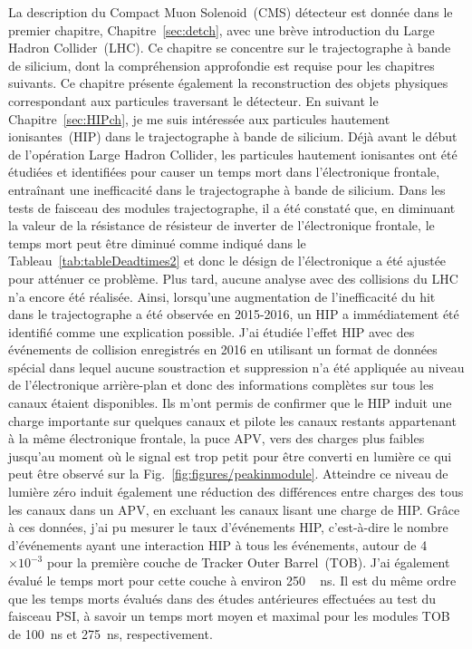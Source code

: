 La description du Compact Muon Solenoid~(CMS)  détecteur est donnée dans le premier chapitre, Chapitre~\ref{sec:detch}, avec une brève introduction du Large Hadron Collider~(LHC). Ce chapitre se concentre sur le trajectographe à bande de silicium, dont la compréhension approfondie est requise pour les chapitres suivants. Ce chapitre présente également la reconstruction des objets physiques correspondant aux particules traversant le détecteur. En suivant le Chapitre~\ref{sec:HIPch}, je me suis intéressée aux particules hautement ionisantes~(HIP) dans le trajectographe à bande de silicium. Déjà avant le début de l'opération Large Hadron Collider, les particules hautement ionisantes ont été étudiées et identifiées pour causer un temps mort dans l'électronique frontale, entraînant une inefficacité dans le trajectographe à bande de silicium. Dans les tests de faisceau des modules trajectographe, il a été constaté que, en diminuant la valeur de la résistance de résisteur de inverter de l’électronique frontale, le temps mort peut être diminué comme indiqué dans le Tableau~\ref{tab:tableDeadtimes2} et donc le désign de l'électronique a été ajustée pour atténuer ce problème. Plus tard, aucune analyse avec des collisions du LHC n'a encore été réalisée. Ainsi, lorsqu'une augmentation de l'inefficacité du hit dans le trajectographe a été observée en 2015-2016, un HIP a immédiatement été identifié comme une explication possible. J'ai étudiée l'effet HIP avec des événements de collision enregistrés en 2016 en utilisant un format de données spécial dans lequel aucune soustraction et suppression n'a été appliquée au niveau de l'électronique arrière-plan et donc des informations complètes sur tous les canaux étaient disponibles. Ils m'ont permis de confirmer que le HIP induit une charge importante sur quelques canaux et pilote les canaux restants appartenant à la même électronique frontale, la puce APV, vers des charges plus faibles jusqu'au moment où le signal est trop petit pour être converti en lumière ce qui peut être observé sur la Fig.~\ref{fig:figures/peakinmodule}. Atteindre ce niveau de lumière zéro induit également une réduction des différences entre charges des tous les canaux dans un APV, en excluant les canaux lisant une charge de HIP. Grâce à ces données, j'ai pu mesurer le taux d'événements HIP, c'est-à-dire le nombre d'événements ayant une interaction HIP  à  tous les événements, autour de 4 $\times 10^{-3} $ pour la première couche de Tracker Outer Barrel~(TOB). J'ai également évalué le temps mort pour cette couche à environ 250 ~ ns. Il est du même ordre que les temps morts évalués dans des études antérieures effectuées au test du faisceau PSI, à savoir un temps mort moyen et maximal pour les modules TOB de 100~ns et 275~ns, respectivement.

